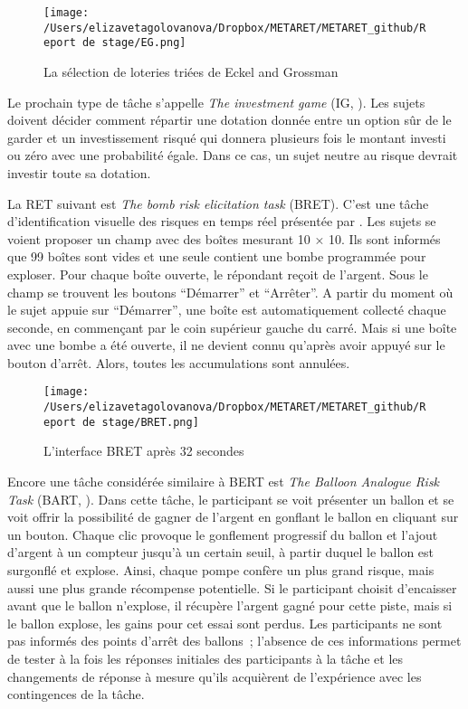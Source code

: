 \documentclass[12pt]{article}
\begin{document}
\begin{figure}
\centering
\texttt{[image: /Users/elizavetagolovanova/Dropbox/METARET/METARET\_github/Report de stage/EG.png]}
\caption{La sélection de loteries triées de Eckel and Grossman}
\end{figure}

Le prochain type de tâche s'appelle \emph{The investment game} (IG,
\citet{Gneezy1997}). Les sujets doivent décider comment répartir une
dotation donnée entre un option sûr de le garder et un investissement
risqué qui donnera plusieurs fois le montant investi ou zéro avec une
probabilité égale. Dans ce cas, un sujet neutre au risque devrait
investir toute sa dotation.

La RET suivant est \emph{The bomb risk elicitation task} (BRET). C'est
une tâche d'identification visuelle des risques en temps réel présentée
par \citet{CroFil2013b}. Les sujets se voient proposer un champ avec des
boîtes mesurant 10 × 10. Ils sont informés que 99 boîtes sont vides et
une seule contient une bombe programmée pour exploser. Pour chaque boîte
ouverte, le répondant reçoit de l'argent. Sous le champ se trouvent les
boutons ``Démarrer'' et ``Arrêter''. A partir du moment où le sujet
appuie sur ``Démarrer'', une boîte est automatiquement collecté chaque
seconde, en commençant par le coin supérieur gauche du carré. Mais si
une boîte avec une bombe a été ouverte, il ne devient connu qu'après
avoir appuyé sur le bouton d'arrêt. Alors, toutes les accumulations sont
annulées.

\begin{figure}
\centering
\texttt{[image: /Users/elizavetagolovanova/Dropbox/METARET/METARET\_github/Report de stage/BRET.png]}
\caption{L'interface BRET après 32 secondes}
\end{figure}

Encore une tâche considérée similaire à BERT est \emph{The Balloon
Analogue Risk Task} (BART, \citet{Hunt2005}). Dans cette tâche, le
participant se voit présenter un ballon et se voit offrir la possibilité
de gagner de l'argent en gonflant le ballon en cliquant sur un bouton.
Chaque clic provoque le gonflement progressif du ballon et l'ajout
d'argent à un compteur jusqu'à un certain seuil, à partir duquel le
ballon est surgonflé et explose. Ainsi, chaque pompe confère un plus
grand risque, mais aussi une plus grande récompense potentielle. Si le
participant choisit d'encaisser avant que le ballon n'explose, il
récupère l'argent gagné pour cette piste, mais si le ballon explose, les
gains pour cet essai sont perdus. Les participants ne sont pas informés
des points d'arrêt des ballons~; l'absence de ces informations permet de
tester à la fois les réponses initiales des participants à la tâche et
les changements de réponse à mesure qu'ils acquièrent de l'expérience
avec les contingences de la tâche.
\end{document}
